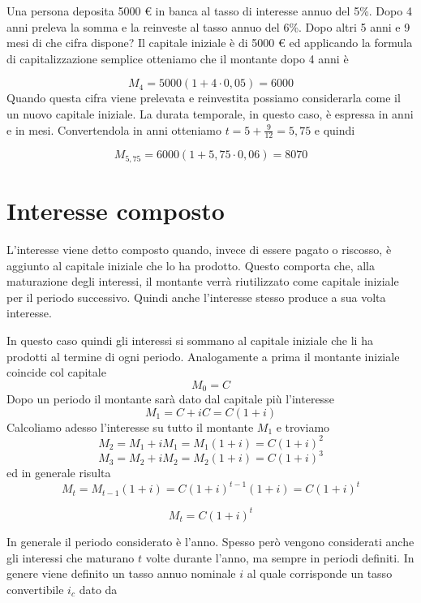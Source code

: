\begin{exrig}
\begin{esempio}
Una persona deposita 5000 € in banca al tasso di interesse annuo del 5\%. Dopo 
4 anni preleva la somma e la reinveste al tasso annuo del 6\%. Dopo altri 5 
anni 
e 9 mesi di che cifra dispone?
Il capitale iniziale è di 5000 € ed applicando la formula di capitalizzazione 
semplice otteniamo che il montante dopo 4 anni è

\[M_4 = 5000(1+4\cdot0,05) = 6000\]
Quando questa cifra viene prelevata e reinvestita possiamo considerarla come il 
un nuovo capitale iniziale. La durata temporale, in questo caso, è espressa in 
anni e in mesi. Convertendola in anni otteniamo \(t = 5 +\frac{9}{12} = 5,75\) e 
quindi

\[M_{5,75} = 6000(1+5,75\cdot0,06) = 8070\]
\end{esempio}
\end{exrig}

\section{Interesse composto}

L'interesse viene detto composto quando, invece di essere pagato o riscosso, è 
aggiunto al capitale iniziale che lo ha prodotto. Questo comporta che, alla 
maturazione degli interessi, il montante verrà riutilizzato come capitale 
iniziale per il periodo successivo. Quindi anche l'interesse stesso produce a sua volta interesse.

In questo caso quindi gli interessi si sommano al capitale iniziale che li ha 
prodotti al termine di ogni periodo.
Analogamente a prima il montante iniziale coincide col capitale
\[ M_{0}=C \]
Dopo un periodo il montante sarà dato dal capitale più l'interesse
\[M_{1}=C+iC=C(1+i)\]
Calcoliamo adesso l'interesse su tutto il montante \(M_1\) e troviamo
\[M_{2}=M_1+iM_1=M_1(1+i)=C(1+i)^2\]
\[M_{3}=M_2+iM_2=M_2(1+i)=C(1+i)^3\]
ed in generale risulta
\[M_{t}=M_{t-1}(1+i) = C(1+i)^{t-1}(1+i)=C(1+i)^{t}\]

\begin{definizione}
\[ M_{t}=C(1+i)^t \]
\end{definizione}

In generale il periodo considerato è l'anno. Spesso però vengono considerati 
anche gli interessi che maturano \(t\) volte durante l'anno, ma sempre in periodi 
definiti. In genere viene definito un tasso annuo nominale \(i\) al quale 
corrisponde un tasso convertibile \(i_c\) dato da

